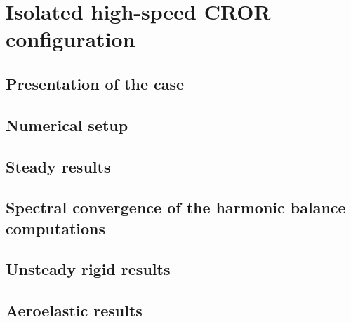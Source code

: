 \chapter{Isolated high-speed CROR configuration}
\label{cha:dream_hs_isolated}

\chabstract{}

\minitoc
\newpage

\section{Presentation of the case}
\label{sec:dream_hs_presentation}


\section{Numerical setup}
\label{sec:dream_hs_numerical}


\section{Steady results}
\label{sec:dream_hs_steady_results}


\section{Spectral convergence of the harmonic balance computations}
\label{sec:dream_hs_spectral_convergence}


\section{Unsteady rigid results}
\label{sec:dream_hs_rigid_results}


\section{Aeroelastic results}
\label{sec:dream_hs_ael_results}


\chconclu{}
